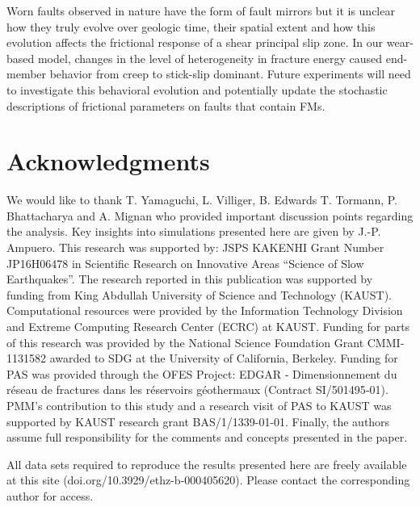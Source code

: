 \documentclass[preprint,1p, 10pt,authoryear]{elsarticle}
\begin{document}
Worn faults observed in nature have the form of fault mirrors but it is unclear how they truly evolve over geologic time, their spatial extent and how this evolution affects the frictional response of a shear principal slip zone. In our wear-based model, changes in the level of heterogeneity in fracture energy caused end-member behavior from creep to stick-slip dominant. Future experiments will need to investigate this behavioral evolution and potentially update the stochastic descriptions of frictional parameters on faults that contain FMs. 

\section*{Acknowledgments}
We would like to thank T. Yamaguchi, L. Villiger, B. Edwards T. Tormann, P. Bhattacharya and A. Mignan who provided important discussion points regarding the analysis. Key insights into simulations presented here are given by J.-P. Ampuero. This research was supported by: JSPS KAKENHI Grant Number JP16H06478 in Scientific Research on Innovative Areas ``Science of Slow Earthquakes''. The research reported in this publication was supported by funding from King Abdullah University of Science and Technology (KAUST). Computational resources were provided by the Information Technology Division and Extreme Computing Research Center (ECRC) at KAUST. Funding for parts of this research was provided by the National Science Foundation Grant CMMI‐1131582 awarded to SDG at the University of California, Berkeley. Funding for PAS was provided through the OFES Project: EDGAR ‐ Dimensionnement du réseau de fractures dans les réservoirs géothermaux (Contract SI/501495‐01). PMM's contribution to this study and a research visit of PAS to KAUST was supported by KAUST research grant BAS/1/1339-01-01. Finally, the authors assume full responsibility for the comments and concepts presented in the paper.

All data sets required to reproduce the results presented here are freely available at this site (doi.org/10.3929/ethz-b-000405620). Please contact the corresponding author for access.

\singlespacing

 

\end{document}
